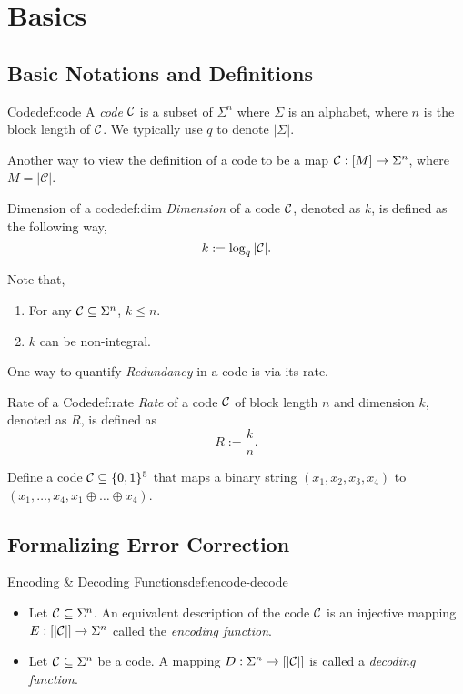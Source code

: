 \chapter{Basics}



\section{Basic Notations and Definitions}
  \begin{definition}{Code}{def:code}
  	A \textit{code} $\mathcal{C}$ is a subset of $ \Sigma^n$ where $\Sigma$ is an alphabet, where $n$ is the block length of $\mathcal{C}$. We typically use $q$ to denote $|\Sigma|$.
  \end{definition}
  Another way to view the definition of a code to be a map $\mathcal{C}: [M]\to \Sigma^n$, where $M = |\mathcal{C}|$. 
  \begin{definition}{Dimension of a code}{def:dim}
  	\textit{Dimension} of a code $\mathcal{C}$, denoted as $k$, is defined as the following way, 
  	\[
  	k := \log_q|\mathcal{C}|.
  	\]
  \end{definition}
  	\begin{remark} Note that, 
\begin{enumerate}
		\item For any $\mathcal{C}\subseteq\Sigma^n$, $k\leq n$.
	\item $k$ can be non-integral.
\end{enumerate}
\end{remark}

One way to quantify \textit{Redundancy} in a code is via its rate.
\begin{definition}{Rate of a Code}{def:rate}
	\textit{Rate} of a code $\mathcal{C}$ of block length $n$ and dimension $k$, denoted as $R$, is defined as 
	\[
	R := \frac{k}{n}.
	\]
\end{definition}

\begin{example}
Define a code $\mathcal{C}\subseteq\{0,1\}^5$ that maps a binary string $(x_1, x_2, x_3, x_4)$ to $(x_1, \ldots, x_4, x_1\oplus\ldots\oplus x_4)$.
\end{example}



\section{Formalizing Error Correction}
\begin{definition}{Encoding \& Decoding Functions}{def:encode-decode}
	\begin{itemize}
\item 	Let $\mathcal{C}\subseteq \Sigma^n$. An equivalent description of the code $\mathcal{C}$ is an injective mapping $E : [|\mathcal{C}|]\to \Sigma^n$ called the \textit{encoding function}.
\item Let $\mathcal{C}\subseteq \Sigma^n$ be a code. A mapping $D:\Sigma^n\to[|\mathcal{C}|]$ is called a \textit{decoding function}.
	\end{itemize}
\end{definition}

